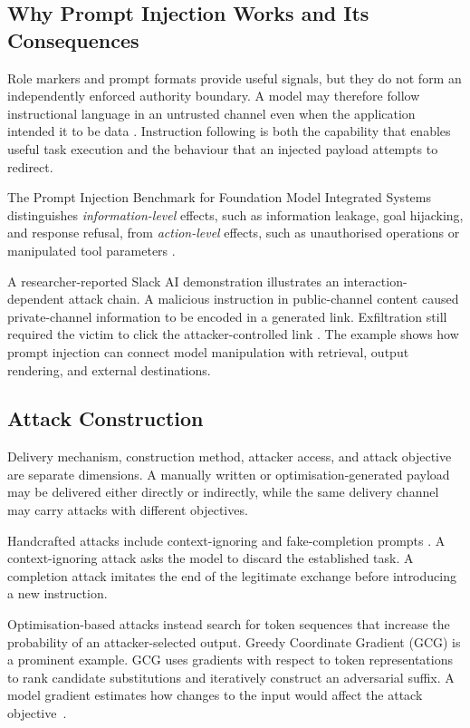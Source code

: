 \subsection{Why Prompt Injection Works and Its Consequences}
\label{subsec:prompt-injection-consequences}

Role markers and prompt formats provide useful signals, but they do not form an
independently enforced authority boundary. A model may therefore follow
instructional language in an untrusted channel even when the application
intended it to be data
\parencites{liu2023promptinjection}{wallace2024instruction}. Instruction
following is both the capability that enables useful task execution and the
behaviour that an injected payload attempts to redirect.

The Prompt Injection Benchmark for Foundation Model Integrated Systems
distinguishes \emph{information-level} effects, such as information leakage,
goal hijacking, and response refusal, from \emph{action-level} effects, such as
unauthorised operations or manipulated tool parameters
\parencite{fspib2025}.

A researcher-reported Slack AI demonstration illustrates an
interaction-dependent attack chain. A malicious instruction in public-channel
content caused private-channel information to be encoded in a generated link.
Exfiltration still required the victim to click the attacker-controlled link
\parencite{promptarmor2024slack}. The example shows how prompt injection can
connect model manipulation with retrieval, output rendering, and external
destinations.

\subsection{Attack Construction}
\label{subsec:attack-construction}

Delivery mechanism, construction method, attacker access, and attack objective
are separate dimensions. A manually written or optimisation-generated payload
may be delivered either directly or indirectly, while the same delivery channel
may carry attacks with different objectives.

Handcrafted attacks include context-ignoring and fake-completion prompts
\parencite{jia2025critical}. A context-ignoring attack asks the model to discard
the established task. A completion attack imitates the end of the legitimate
exchange before introducing a new instruction.

Optimisation-based attacks instead search for token sequences that increase the
probability of an attacker-selected output. Greedy Coordinate Gradient (GCG)
is a prominent example. GCG uses gradients with respect to token
representations to rank candidate substitutions and iteratively construct an
adversarial suffix. A model gradient estimates how changes to the input
would affect the attack objective~\parencite{zou2023universal}.

